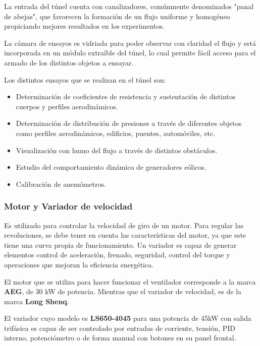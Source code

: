 	La entrada del túnel cuenta con canalizadores, comúnmente denominados "panal de abejas", que favorecen la formación de un flujo uniforme y homogéneo propiciando mejores resultados en los experimentos.
	
	La cámara de ensayos es vidriada para poder observar con claridad el flujo y está incorporada en un módulo extraíble del túnel, lo cual permite fácil acceso para el armado de los distintos objetos a ensayar.
	
	Los distintos ensayos que se realizan en el túnel son:
	\begin{itemize}
		\item  Determinación de coeficientes de resistencia y sustentación de distintos cuerpos y perfiles aerodinámicos. 
		\item Determinación de distribución de presiones a través de diferentes objetos como perfiles aerodinámicos, edificios, puentes, automóviles, etc.
		\item Visualización con humo del flujo a través de distintos obstáculos.
		\item Estudio del comportamiento dinámico de generadores eólicos. 
		\item Calibración de anemómetros.
	\end{itemize}

	\subsubsection{Motor y Variador de velocidad}
		\begin{tcolorbox}[colback=blue!5!white,colframe=blue!75!black,title=Variador de velocidad]
			Es utilizado para controlar la velocidad de giro de un motor. Para regular las revoluciones, se debe tener en cuenta las características del motor, ya que este tiene  una  curva  propia  de  funcionamiento.  Un  variador  es  capaz  de  generar elementos  control  de  aceleración,  frenado,  seguridad,  control  del  torque  y operaciones que mejoran la eficiencia energética.\end{tcolorbox}	

		
El motor que se utiliza para hacer funcionar el ventilador corresponde a la marca \textbf{AEG}, de 30 kW de potencia\cite{barila1993desarrollo}. Mientras que el variador de velocidad, es de la marca \textbf{Long Shenq}.

El variador cuyo modelo es \textbf{LS650-4045} para una potencia de 45kW con salida trifásica es capaz de ser controlado por entradas de corriente, tensión, PID interno, potenciómetro o de forma manual con botones en su panel frontal.



